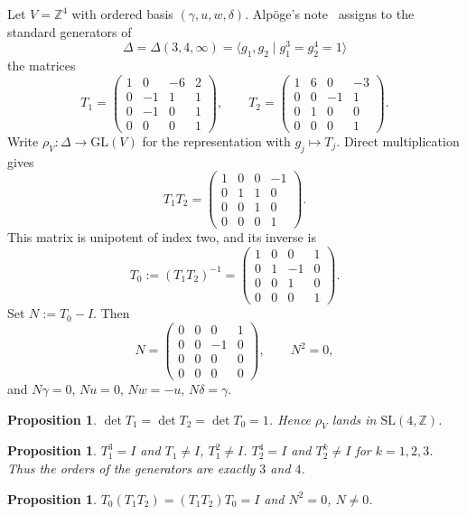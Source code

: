 \documentclass[11pt,a4paper]{article}
\newtheorem{proposition}[theorem]{Proposition}
\theoremstyle{definition}
\theoremstyle{remark}
\newcommand{\Z}{\mathbb{Z}}
\begin{document}
Let $V=\Z^4$ with ordered basis $(\gamma,u,w,\delta)$. Alp\"oge's note~\cite{AlpogeS6} assigns to the standard generators of
\[
\Delta=\Delta(3,4,\infty)=\langle g_1,g_2\mid g_1^3=g_2^4=1\rangle
\]
the matrices
\[
T_1=\begin{pmatrix}1&0&-6&2\\0&-1&1&1\\0&-1&0&1\\0&0&0&1\end{pmatrix},\qquad
T_2=\begin{pmatrix}1&6&0&-3\\0&0&-1&1\\0&1&0&0\\0&0&0&1\end{pmatrix}.
\]
Write $\rho_V:\Delta\to\mathrm{GL}(V)$ for the representation with $g_j\mapsto T_j$. Direct multiplication gives
\[
T_1T_2=\begin{pmatrix}1&0&0&-1\\0&1&1&0\\0&0&1&0\\0&0&0&1\end{pmatrix}.
\]
This matrix is unipotent of index two, and its inverse is
\[
T_0:=(T_1T_2)^{-1}=\begin{pmatrix}1&0&0&1\\0&1&-1&0\\0&0&1&0\\0&0&0&1\end{pmatrix}.
\]
Set $N:=T_0-I$. Then
\[
N=\begin{pmatrix}0&0&0&1\\0&0&-1&0\\0&0&0&0\\0&0&0&0\end{pmatrix},\qquad N^2=0,
\]
and $N\gamma=0$, $Nu=0$, $Nw=-u$, $N\delta=\gamma$.

\begin{proposition}
$\det T_1=\det T_2=\det T_0=1$. Hence $\rho_V$ lands in $\mathrm{SL}(4,\Z)$.
\end{proposition}

\begin{proposition}
$T_1^3=I$ and $T_1\neq I$, $T_1^2\neq I$. $T_2^4=I$ and $T_2^k\neq I$ for $k=1,2,3$. Thus the orders of the generators are exactly $3$ and $4$.
\end{proposition}

\begin{proposition}
$T_0(T_1T_2)=(T_1T_2)T_0=I$ and $N^2=0$, $N\neq 0$.
\end{proposition}
\end{document}

